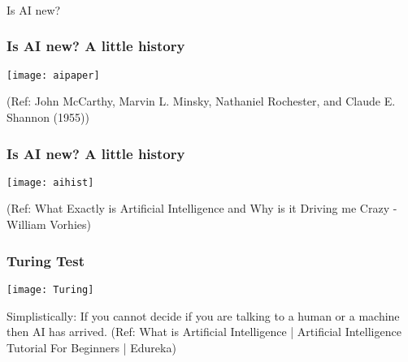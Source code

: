 \begin{frame}[fragile]\frametitle{}
\begin{center}
{\Large Is AI new?}
\end{center}
\end{frame}



\begin{frame}[fragile]\frametitle{Is AI new? A little history}
\begin{center}
\texttt{[image: aipaper]}
\end{center}
{\tiny (Ref:  John McCarthy, Marvin L. Minsky, Nathaniel Rochester, and Claude E. Shannon (1955))}
\end{frame}

\begin{frame}[fragile]\frametitle{Is AI new? A little history}
\begin{center}
\texttt{[image: aihist]}
\end{center}
{\tiny (Ref:  What Exactly is Artificial Intelligence and Why is it Driving me Crazy - William Vorhies)}
\end{frame}

\begin{frame}[fragile]\frametitle{Turing Test}
\begin{center}
\texttt{[image: Turing]}
\end{center}
Simplistically: If you cannot decide if you are talking to a human or a machine then AI has arrived.
{\tiny (Ref:  What is Artificial Intelligence | Artificial Intelligence Tutorial For Beginners | Edureka)}
\end{frame}





